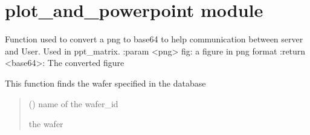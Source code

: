 \documentclass[letterpaper,10pt,english]{sphinxmanual}
\begin{document}
\sphinxstepscope


\section{plot\_and\_powerpoint module}
\label{\detokenize{plot_and_powerpoint:module-plot_and_powerpoint}}\label{\detokenize{plot_and_powerpoint:plot-and-powerpoint-module}}\label{\detokenize{plot_and_powerpoint::doc}}

\begin{fulllineitems}
\label{\detokenize{plot_and_powerpoint:plot_and_powerpoint.fig_to_base64}}
\pysigstartsignatures
{}
\pysigstopsignatures
\sphinxAtStartPar
Function used to convert a png to base64 to help communication between server and User. Used in ppt\_matrix.
:param \textless{}png\textgreater{} fig: a figure in png format
:return \textless{}base64\textgreater{}: The converted figure

\end{fulllineitems}


\begin{fulllineitems}
\label{\detokenize{plot_and_powerpoint:plot_and_powerpoint.get_wafer}}
\pysigstartsignatures
{}
\pysigstopsignatures
\sphinxAtStartPar
This function finds the wafer specified in the database
\begin{quote}\begin{description}
\sphinxAtStartPar
{} () \textendash{} name of the wafer\_id

\sphinxAtStartPar
the wafer

\end{description}\end{quote}

\end{fulllineitems}
\end{document}
